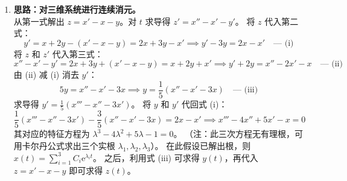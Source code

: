 \documentclass[lang=cn,11pt]{elegantbook}
\begin{document}
\begin{solution}
\begin{enumerate}
    \item[(3)] \textbf{思路：对三维系统进行连续消元。}\\
    从第一式解出 $z = x' - x - y$。对 $t$ 求导得 $z' = x'' - x' - y'$。
    将 $z$ 代入第二式：
    \[
    y' = x + 2y - (x' - x - y) = 2x + 3y - x' \implies y' - 3y = 2x - x' \quad \text{--- (i)}
    \]
    将 $z$ 和 $z'$ 代入第三式：
    \[
    x'' - x' - y' = 2x + 3y + (x' - x - y) = x + 2y + x' \implies y' + 2y = x'' - 2x' - x \quad \text{--- (ii)}
    \]
    由 (ii) 减 (i) 消去 $y'$：
    \[
    5y = x'' - x' - 3x \implies y = \frac{1}{5}(x'' - x' - 3x) \quad \text{--- (iii)}
    \]
    求导得 $y' = \frac{1}{5}(x''' - x'' - 3x')$。
    将 $y$ 和 $y'$ 代回式 (i)：
    \[
    \frac{1}{5}(x''' - x'' - 3x') - \frac{3}{5}(x'' - x' - 3x) = 2x - x' \implies x''' - 4x'' + 5x' - x = 0
    \]
    其对应的特征方程为 $\lambda^3 - 4\lambda^2 + 5\lambda - 1 = 0$。
    （注：此三次方程无有理根，可用卡尔丹公式求出三个实根 $\lambda_1, \lambda_2, \lambda_3$）。
    在此假设已解出根，则 $x(t) = \sum_{i=1}^3 C_i \mathrm{e}^{\lambda_i t}$。
    之后，利用式 (iii) 可求得 $y(t)$，再代入 $z = x' - x - y$ 即可求得 $z(t)$。
\end{enumerate}
\end{solution}
\end{document}
